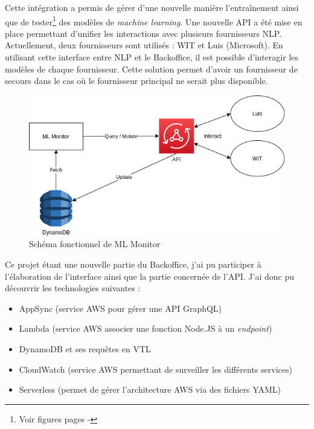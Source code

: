 \documentclass[12pt,a4paper,oneside]{scrreprt}
\begin{document}
Cette intégration a permis de gérer d'une nouvelle manière l'entraînement ainsi que de tester\footnote{Voir figures pages \pageref{fig:mlmonitor_test}-\pageref{fig:mlmonitor_test}} des modèles de \textit{machine learning}. Une nouvelle API a été mise en place permettant d'unifier les interactions avec plusieurs fournisseurs NLP. Actuellement, deux fournisseurs sont utilisés : WIT et Luis (Microsoft). En utilisant cette interface entre NLP et le Backoffice, il est possible d'interagir les modèles de chaque fournisseur. Cette solution permet d'avoir un fournisseur de secours dans le cas où le fournisseur principal ne serait plus disponible.

\begin{figure}[!ht]
	\includegraphics[width=\textwidth]{pictures/diagram_mlmonitor.png}
	\caption{Schéma fonctionnel de ML Monitor}
\end{figure}

\begin{info}
	Ce projet étant une nouvelle partie du Backoffice, j'ai pu participer à l'élaboration de l'interface ainsi que la partie concernée de l'API. J'ai donc pu découvrir les technologies suivantes :
	\begin{itemize}
		\item AppSync (service AWS pour gérer une API GraphQL)
		\item Lambda (service AWS associer une fonction Node.JS à un \textit{endpoint})
		\item DynamoDB et ses requêtes en VTL
		\item CloudWatch (service AWS permettant de surveiller les différents services)
		\item Serverless (permet de gérer l'architecture AWS via des fichiers YAML)
	\end{itemize}
\end{info}
\end{document}
